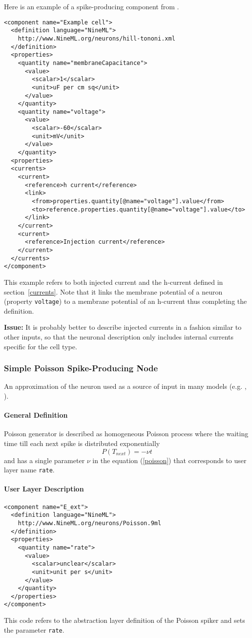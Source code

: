 \documentclass{article}
\newcommand{\issue}[1]{%
\begin{center}
\colorbox{issuecolor}{\parbox{0.8\linewidth}{\textbf{Issue:} #1}}
\end{center}%
}
\begin{document}
Here is an example of a spike-producing component from \cite{hill-tononi-05}.
\begin{verbatim}
<component name="Example cell">
  <definition language="NineML">
    http://www.NineML.org/neurons/hill-tononi.xml
  </definition>
  <properties>
    <quantity name="membraneCapacitance">
      <value>
        <scalar>1</scalar>
        <unit>uF per cm sq</unit>
      </value>
    </quantity>
    <quantity name="voltage">
      <value>
        <scalar>-60</scalar>
        <unit>mV</unit>
      </value>
    </quantity>
  <properties>
  <currents>
    <current>
      <reference>h current</reference>
      <link>
        <from>properties.quantity[@name="voltage"].value</from>
        <to>reference.properties.quantity[@name="voltage"].value</to>
      </link>
    </current>
    <current>
      <reference>Injection current</reference>
    </current>
  </currents>
</component>
\end{verbatim}
This example refers to both injected current and the h-current defined in
section~\ref{currents}. Note that it links the membrane potential of a neuron
(property {\tt voltage}) to a membrane potential of an h-current thus
completing the definition.

\issue{It is probably better to describe injected currents in a fashion similar
to other inputs, so that the neuronal description only includes internal currents
specific for the cell type.}

\subsubsection{Simple Poisson Spike-Producing Node}

An approximation of the neuron used as a source of input in many models
(e.g. \cite{brunel-00},\\ \cite{morrison-etal-07}).

\paragraph{General Definition}
Poisson generator is described as homogeneous Poisson process where the
waiting time till each next spike is distributed exponentially
\begin{equation}
P(T_{next})=-\nu t
\label{poisson}
\end{equation}
and has a single parameter $\nu$ in the equation (\ref{poisson}) that
corresponds to user layer name {\tt rate}.

\paragraph{User Layer Description}
\begin{verbatim}
<component name="E_ext">
  <definition language="NineML">
    http://www.NineML.org/neurons/Poisson.9ml
  </definition>
  <properties>
    <quantity name="rate">
      <value>
        <scalar>unclear</scalar>
        <unit>unit per s</unit>
      </value>
    </quantity>
  </properties>
</component>
\end{verbatim}
This code refers to the abstraction layer definition of the Poisson spiker and
sets the parameter {\tt rate}.
\end{document}

